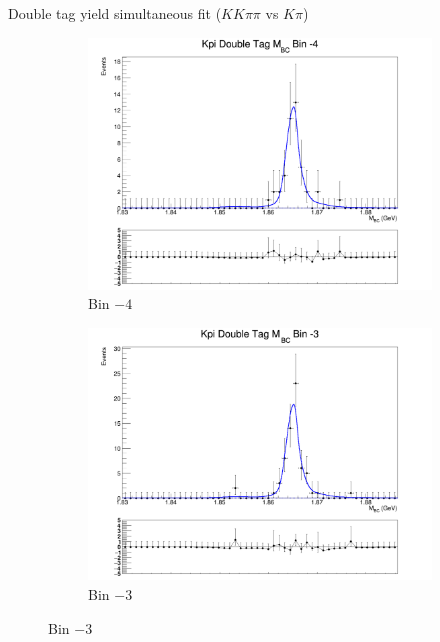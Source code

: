\documentclass{beamer}
\begin{document}
\begin{frame}{Double tag yield simultaneous fit ($KK\pi\pi$ vs $K\pi$)}
  \begin{figure}
    \centering
    \begin{subfigure}{0.38\textwidth}
      \centering
      \includegraphics[width=\textwidth]{Plots/DoubleTagYield_DoubleTag_Flavour_KKpipi_vs_Kpi_SignalBinM4_TagBin0.png}
      \caption{Bin $-4$}
    \end{subfigure}%
    \begin{subfigure}{0.38\textwidth}
      \centering
      \includegraphics[width=\textwidth]{Plots/DoubleTagYield_DoubleTag_Flavour_KKpipi_vs_Kpi_SignalBinM3_TagBin0.png}
      \caption{Bin $-3$}
    \end{subfigure}

\end{figure}
\end{frame}
\end{document}
